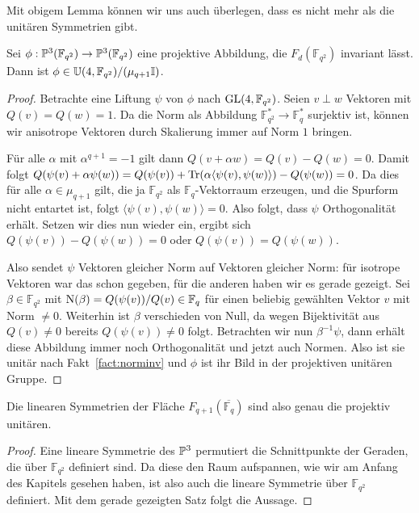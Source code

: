 Mit obigem Lemma können wir uns auch überlegen, dass es nicht mehr als die unitären Symmetrien gibt.
\begin{theorem}
Sei $\phi: \mathbb P^{3}(\mathbb F_{q^2}) \rightarrow \mathbb P^{3}(\mathbb F_{q^2})$ eine projektive Abbildung, die $F_d(\mathbb F_{q^2})$ invariant lässt. Dann ist $\phi \in \mathbb U(4,\mathbb F_{q^2})/(\mu_{q+1} \mathbb I)$.
\end{theorem}
\begin{proof}
Betrachte eine Liftung $\psi$ von $\phi$ nach $\mathrm{GL}(4,\mathbb F_{q^2})$. Seien $v \perp w$ Vektoren mit $Q(v) = Q(w) = 1$. Da die Norm als Abbildung $\mathbb F_{\!q^2}^* \to \mathbb F_q^*$ surjektiv ist, können wir anisotrope Vektoren durch Skalierung immer auf Norm $1$ bringen.

Für alle $\alpha$ mit $\alpha^{q+1} = -1$ gilt dann $Q(v + \alpha w) = Q(v) - Q(w) = 0$. Damit folgt $Q(\psi(v) + \alpha \psi(w)) = Q(\psi(v)) + \operatorname{Tr}(\alpha \langle \psi(v), \psi(w) \rangle) - Q(\psi(w)) = 0$. Da dies für alle $\alpha \in \mu_{q+1}$ gilt, die ja $\mathbb F_{q^2}$ als $\mathbb F_q$-Vektorraum erzeugen, und die Spurform nicht entartet ist, folgt $\langle \psi(v), \psi(w) \rangle = 0$. Also folgt, dass $\psi$ Orthogonalität erhält. Setzen wir dies nun wieder ein, ergibt sich $Q(\psi(v)) - Q(\psi(w)) = 0$ oder $Q(\psi(v)) = Q(\psi(w))$.

Also sendet $\psi$ Vektoren gleicher Norm auf Vektoren gleicher Norm: für isotrope Vektoren war das schon gegeben, für die anderen haben wir es gerade gezeigt. Sei $\beta \in \mathbb F_{q^2}$ mit $\operatorname{N}(\beta) = Q(\psi(v)) / Q(v) \in \mathbb F_q$ für einen beliebig gewählten Vektor $v$ mit Norm $\neq 0$. Weiterhin ist $\beta$ verschieden von Null, da wegen Bijektivität aus $Q(v) \neq 0$ bereits $Q(\psi(v)) \neq 0$ folgt. Betrachten wir nun $\beta^{-1} \psi$, dann erhält diese Abbildung immer noch Orthogonalität und jetzt auch Normen. Also ist sie unitär nach Fakt~\ref{fact:norminv} und $\phi$ ist ihr Bild in der projektiven unitären Gruppe.
\end{proof}
\begin{coroll}
Die linearen Symmetrien der Fläche $F_{q+1}(\overline{\mathbb F_q})$ sind also genau die projektiv unitären.
\end{coroll}
\begin{proof}
Eine lineare Symmetrie des $\mathbb P^{3}$ permutiert die Schnittpunkte der Geraden, die über $\mathbb F_{q^2}$ definiert sind. Da diese den Raum aufspannen, wie wir am Anfang des Kapitels gesehen haben, ist also auch die lineare Symmetrie über $\mathbb F_{q^2}$ definiert. Mit dem gerade gezeigten Satz folgt die Aussage.
\end{proof}

